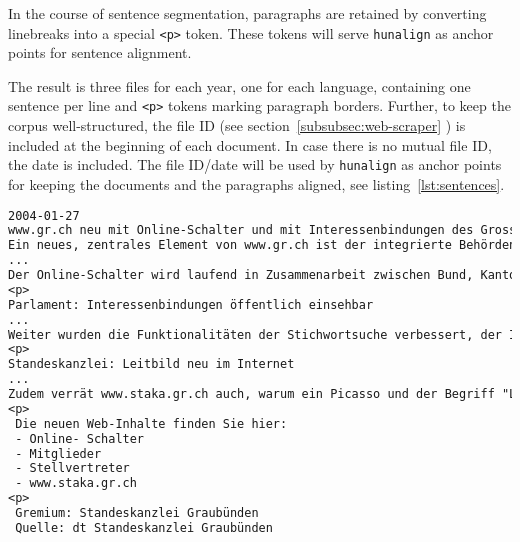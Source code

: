 
In the course of sentence segmentation, paragraphs are retained by converting linebreaks into a special \texttt{<p>} token. 
These tokens will serve \texttt{hunalign} as anchor points for sentence alignment.

The result is three files for each year, one for each language, containing one sentence per line and \texttt{<p>} tokens marking paragraph borders. 
Further, to keep the corpus well-structured, the file ID (see section~\ref{subsubsec:web-scraper} ) is included at the beginning of each document. 
In case there is no mutual file ID, the date is included. 
The file ID/date will be used by \texttt{hunalign} as anchor points for keeping the documents and the paragraphs aligned, see listing~\ref{lst:sentences}.

\vspace{0.5cm}

\begin{lstlisting}[language=txt, caption={A file containing sentences for alignment. 
In order to keep the file structured and increase alignment performance, each document starts with a date and paragraph are boundaries are marked with a special \texttt{<t>} token.}, captionpos=t, label={lst:sentences}]
2004-01-27
www.gr.ch neu mit Online-Schalter und mit Interessenbindungen des Grossen Rats
Ein neues, zentrales Element von www.gr.ch ist der integrierte Behörden-Online-Schalter www.ch.ch.
...
Der Online-Schalter wird laufend in Zusammenarbeit zwischen Bund, Kantonen und Gemeinden weiterentwickelt und inhaltlich erweitert.
<p>
Parlament: Interessenbindungen öffentlich einsehbar 
...
Weiter wurden die Funktionalitäten der Stichwortsuche verbessert, der Informationsgehalt im Bereich "Unser Kanton" erweitert ("Produkte aus Graubünden", Suchmaschine für Graubünden) sowie der Sprachenwechsel zwischen den Inhalten in deutsch, romanisch und italienisch vereinfacht.
<p>
Standeskanzlei: Leitbild neu im Internet 
...
Zudem verrät www.staka.gr.ch auch, warum ein Picasso und der Begriff "Light" ohne weiteres mit der Standeskanzlei Graubünden in Zusammenhang gebracht werden können.
<p>
 Die neuen Web-Inhalte finden Sie hier: 
 - Online- Schalter 
 - Mitglieder 
 - Stellvertreter
 - www.staka.gr.ch 
<p>
 Gremium: Standeskanzlei Graubünden 
 Quelle: dt Standeskanzlei Graubünden
\end{lstlisting}

